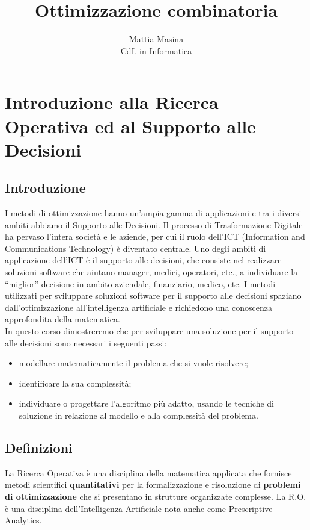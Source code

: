 \documentclass[12pt]{extarticle} %
\title{Ottimizzazione combinatoria}
\author{Mattia Masina\\CdL in Informatica}
\date{}
\begin{document}
\maketitle
\newpage
\tableofcontents
\newpage

\section{Introduzione alla Ricerca Operativa ed al Supporto alle Decisioni}
\subsection{Introduzione}
I metodi di ottimizzazione hanno un'ampia gamma di applicazioni e tra i diversi ambiti abbiamo il Supporto alle Decisioni. Il processo di Trasformazione Digitale ha pervaso l'intera società e le aziende, per cui il ruolo dell'ICT (Information and Communications Technology) è diventato centrale. Uno degli ambiti di applicazione dell'ICT è il supporto alle decisioni, che consiste nel realizzare soluzioni software che aiutano manager, medici, operatori, etc., a individuare la “miglior” decisione in ambito aziendale, finanziario, medico, etc. I metodi utilizzati per sviluppare soluzioni software per il supporto alle decisioni spaziano dall'ottimizzazione all'intelligenza artificiale e richiedono una conoscenza approfondita della matematica.\\

In questo corso dimostreremo che per sviluppare una soluzione per il supporto alle decisioni sono necessari i seguenti passi:
\begin{itemize}
    \item modellare matematicamente il problema che si vuole risolvere;
    \item identificare la sua complessità;
    \item individuare o progettare l'algoritmo più adatto, usando le tecniche di soluzione in relazione al modello e alla complessità del problema.
\end{itemize}

\subsection{Definizioni}
La Ricerca Operativa è una disciplina della matematica applicata che fornisce metodi scientifici \textbf{quantitativi} per la formalizzazione e risoluzione di \textbf{problemi di ottimizzazione} che si presentano in strutture organizzate complesse. La R.O. è una disciplina dell'Intelligenza Artificiale nota anche come Prescriptive Analytics.\\
\end{document}
